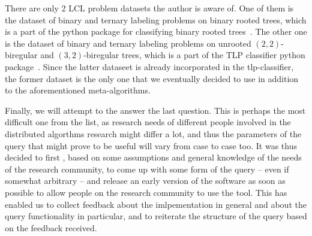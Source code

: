 There are only 2 LCL problem datasets the author is aware of. One of them is the dataset of binary and ternary labeling problems on binary rooted trees, which is a
part of the python package for classifying binary rooted trees~\cite{Tereshchenko2020brt}. The other one is the dataset of binary and ternary labeling problems on
unrooted $(2, 2)$-biregular and $(3, 2)$-biregular trees, which is a part of the TLP classifier python package~\cite{Rocher2020clas}. Since the latter dataseet is already incorporated in the tlp-classifier,
the former dataset is the only one that we eventually decided to use
in addition to the aforementioned meta-algorithms.

Finally, we will attempt to the answer the last question.
This is perhaps the most difficult one from the list,
as research needs of different people involved in 
the distributed algorthms research might differ a lot, and thus
the parameters of the query that might prove to be useful
will vary from case to case too. It was thus decided to first
, based on some assumptions and general knowledge of the
needs of the research community, to come up with some form of the
query -- even if somewhat arbitrary -- and release an early version
of the software as soon as possible to allow people on the
research community to use the tool. This has enabled us to
collect feedback about the imlpementation in general and about the
query functionality in particular, and to reiterate the structure of
the query based on the feedback received.


